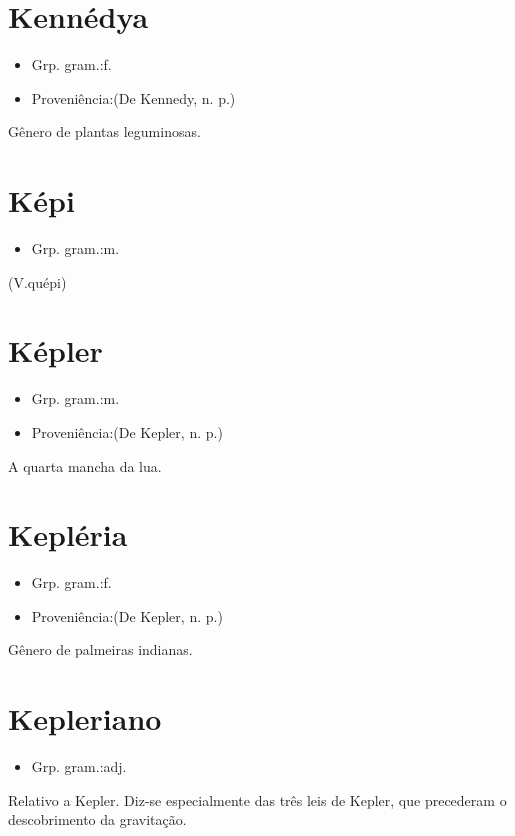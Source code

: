\documentclass{article}
\begin{document}
\section{Kennédya}
\begin{itemize}
\item {Grp. gram.:f.}
\end{itemize}
\begin{itemize}
\item {Proveniência:(De \textunderscore Kennedy\textunderscore , n. p.)}
\end{itemize}
Gênero de plantas leguminosas.
\section{Képi}
\begin{itemize}
\item {Grp. gram.:m.}
\end{itemize}
(V.quépi)
\section{Képler}
\begin{itemize}
\item {Grp. gram.:m.}
\end{itemize}
\begin{itemize}
\item {Proveniência:(De \textunderscore Kepler\textunderscore , n. p.)}
\end{itemize}
A quarta mancha da lua.
\section{Kepléria}
\begin{itemize}
\item {Grp. gram.:f.}
\end{itemize}
\begin{itemize}
\item {Proveniência:(De \textunderscore Kepler\textunderscore , n. p.)}
\end{itemize}
Gênero de palmeiras indianas.
\section{Kepleriano}
\begin{itemize}
\item {Grp. gram.:adj.}
\end{itemize}
Relativo a Kepler.
Diz-se especialmente das três leis de Kepler, que precederam o descobrimento da gravitação.
\end{document}
